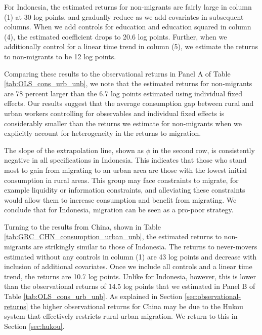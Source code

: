\documentclass[12pt]{article}
\begin{document}
For Indonesia, the estimated returns for non-migrants are fairly large in column (1) at 30 log points, and gradually reduce as we add covariates in subsequent columns.
When we add controls for education and education squared in column (4), the estimated coefficient drops to 20.6 log points. 
Further, when we additionally control for a linear time trend in column (5), we estimate the returns to non-migrants to be 12 log points.

Comparing these results to the observational returns in Panel A of Table \ref{tab:OLS_cons_urb_unb}, we note that the estimated returns for non-migrants are 78 percent larger than the 6.7 log points estimated using individual fixed effects.
Our results suggest that the average consumption gap between rural and urban workers controlling for observables and individual fixed effects is considerably smaller than the returns we estimate for non-migrants when we explicitly account for heterogeneity in the returns to migration.






The slope of the extrapolation line, shown as $\phi$ in the second row, is consistently negative in all specifications in Indonesia. This indicates that those who stand most to gain from migrating to an urban area are those with the lowest initial consumption in rural areas. This group may face constraints to migrate, for example liquidity or information constraints, and alleviating these constraints would allow them to increase consumption and benefit from migrating. 
We conclude that for Indonesia, migration can be seen as a pro-poor strategy.

Turning to the results from China, shown in Table \ref{tab:GRC_CHN_consumption_urban_unb}, the estimated returns to non-migrants are strikingly similar to those of Indonesia. 
The returns to never-movers estimated without any controls in column (1) are 43 log points and decrease with inclusion of additional covariates. 
Once we include all controls and a linear time trend, the returns are 10.7 log points. Unlike for Indonesia, however, this is lower than the observational returns of 14.5 log points that we estimated in Panel B of Table \ref{tab:OLS_cons_urb_unb}. 
As explained in Section \ref{sec:observational-returns} the higher observational returns for China may be due to the Hukou system that effectively restricts rural-urban migration.
We return to this in Section \ref{sec:hukou}.
\end{document}
